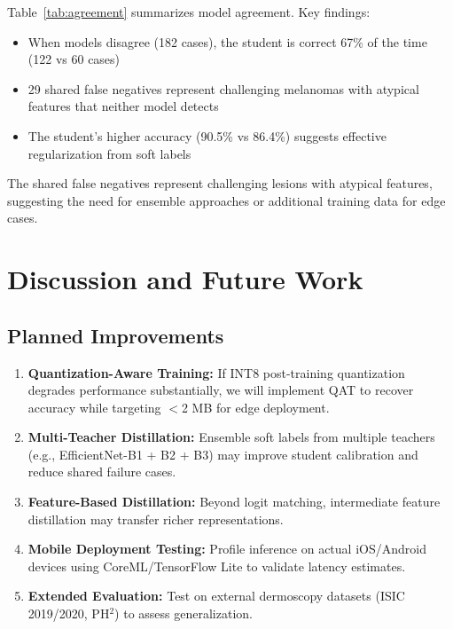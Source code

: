 \documentclass[conference]{IEEEtran}
\begin{document}
Table~\ref{tab:agreement} summarizes model agreement. Key findings:

\begin{itemize}
    \item When models disagree (182 cases), the student is correct 67\% of the time (122 vs 60 cases)
    \item 29 shared false negatives represent challenging melanomas with atypical features that neither model detects
    \item The student's higher accuracy (90.5\% vs 86.4\%) suggests effective regularization from soft labels
\end{itemize}

The shared false negatives represent challenging lesions with atypical features, suggesting the need for ensemble approaches or additional training data for edge cases.

\section{Discussion and Future Work}

\subsection{Planned Improvements}

\begin{enumerate}
    \item \textbf{Quantization-Aware Training:} If INT8 post-training quantization degrades performance substantially, we will implement QAT to recover accuracy while targeting $<$2 MB for edge deployment.
    
    \item \textbf{Multi-Teacher Distillation:} Ensemble soft labels from multiple teachers (e.g., EfficientNet-B1 + B2 + B3) may improve student calibration and reduce shared failure cases.
    
    \item \textbf{Feature-Based Distillation:} Beyond logit matching, intermediate feature distillation \cite{romero2014fitnets} may transfer richer representations.
    
    \item \textbf{Mobile Deployment Testing:} Profile inference on actual iOS/Android devices using CoreML/TensorFlow Lite to validate latency estimates.
    
    \item \textbf{Extended Evaluation:} Test on external dermoscopy datasets (ISIC 2019/2020, PH$^2$) to assess generalization.
\end{enumerate}
\end{document}
